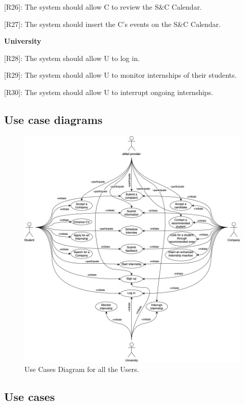{[}R26{]}: The system should allow C to review the S\&C Calendar.

{[}R27{]}: The system should insert the C's events on the S\&C Calendar.

\textbf{University}

{[}R28{]}: The system should allow U to log in.

{[}R29{]}: The system should allow U to monitor internships of their
students.

{[}R30{]}: The system should allow U to interrupt ongoing internships.


\subsection{Use case diagrams}
\label{subsec:use_case_diagrams}%


\begin{figure}[H]
    \begin{center}
        \includegraphics[width=\linewidth]{Images/UCDiagram.png}
        \caption{Use Cases Diagram for all the Users.} 
        \label{fig:UnregisteredUC}%
        \end{center}
\end{figure}


\subsection{Use cases}
\label{subsec: use_cases}%
\setcounter{uc}{1}
\newcommand{\cuc}{\theuc\stepcounter{uc}}


